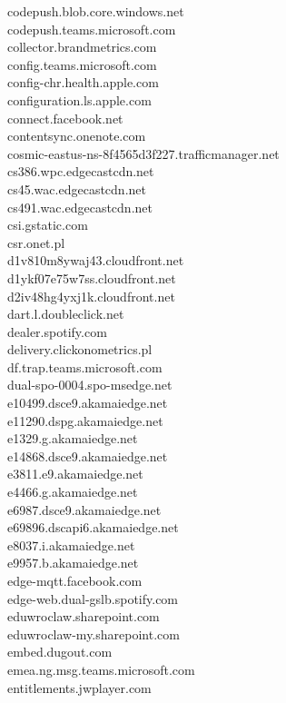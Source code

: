 \documentclass[12pt,a4paper]{article}
\begin{document}
\begin{scriptsize}
\begin{multicols}{3}
\begin{center}
                    codepush.blob.core.windows.net\\codepush.teams.microsoft.com\\collector.brandmetrics.com\\
                    config.teams.microsoft.com\\config-chr.health.apple.com\\configuration.ls.apple.com\\connect.facebook.net\\
                    contentsync.onenote.com\\cosmic-eastus-ns-8f4565d3f227.trafficmanager.net\\cs386.wpc.edgecastcdn.net\\
                    cs45.wac.edgecastcdn.net\\cs491.wac.edgecastcdn.net\\csi.gstatic.com\\csr.onet.pl\\d1v810m8ywaj43.cloudfront.net\\
                    d1ykf07e75w7ss.cloudfront.net\\d2iv48hg4yxj1k.cloudfront.net\\dart.l.doubleclick.net\\dealer.spotify.com\\
                    delivery.clickonometrics.pl\\df.trap.teams.microsoft.com\\dual-spo-0004.spo-msedge.net\\e10499.dsce9.akamaiedge.net\\
                    e11290.dspg.akamaiedge.net\\e1329.g.akamaiedge.net\\e14868.dsce9.akamaiedge.net\\e3811.e9.akamaiedge.net\\
                    e4466.g.akamaiedge.net\\e6987.dsce9.akamaiedge.net\\e69896.dscapi6.akamaiedge.net\\e8037.i.akamaiedge.net\\
                    e9957.b.akamaiedge.net\\edge-mqtt.facebook.com\\edge-web.dual-gslb.spotify.com\\eduwroclaw.sharepoint.com\\
                    eduwroclaw-my.sharepoint.com\\embed.dugout.com\\emea.ng.msg.teams.microsoft.com\\entitlements.jwplayer.com\\

\end{center}
\end{multicols}
\end{scriptsize}
\end{document}
